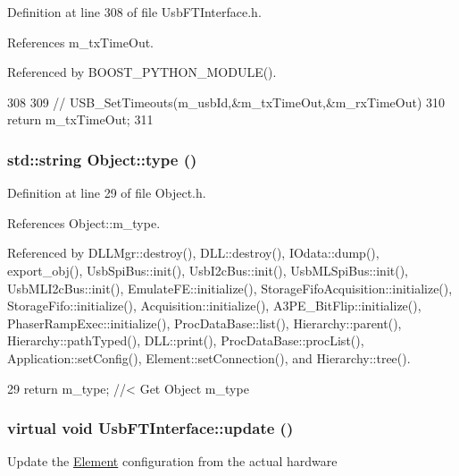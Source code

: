 Definition at line 308 of file UsbFTInterface.h.

References m\_\-txTimeOut.

Referenced by BOOST\_\-PYTHON\_\-MODULE().


\begin{DoxyCode}
308                    {
309     //    USB_SetTimeouts(m_usbId,&m_txTimeOut,&m_rxTimeOut)
310     return m_txTimeOut;
311   }  
\end{DoxyCode}
\hypertarget{classObject_a84f99f70f144a83e1582d1d0f84e4e62}{
\subsubsection[{type}]{\setlength{\rightskip}{0pt plus 5cm}std::string Object::type ()}}
\label{classObject_a84f99f70f144a83e1582d1d0f84e4e62}


Definition at line 29 of file Object.h.

References Object::m\_\-type.

Referenced by DLLMgr::destroy(), DLL::destroy(), IOdata::dump(), export\_\-obj(), UsbSpiBus::init(), UsbI2cBus::init(), UsbMLSpiBus::init(), UsbMLI2cBus::init(), EmulateFE::initialize(), StorageFifoAcquisition::initialize(), StorageFifo::initialize(), Acquisition::initialize(), A3PE\_\-BitFlip::initialize(), PhaserRampExec::initialize(), ProcDataBase::list(), Hierarchy::parent(), Hierarchy::pathTyped(), DLL::print(), ProcDataBase::procList(), Application::setConfig(), Element::setConnection(), and Hierarchy::tree().


\begin{DoxyCode}
29 { return m_type;       } //< Get Object m_type
\end{DoxyCode}
\hypertarget{classUsbFTInterface_a6adc58a50696c9b3268e84c291901ce7}{
\subsubsection[{update}]{\setlength{\rightskip}{0pt plus 5cm}virtual void UsbFTInterface::update ()}}
\label{classUsbFTInterface_a6adc58a50696c9b3268e84c291901ce7}
Update the \hyperlink{classElement}{Element} configuration from the actual hardware 


